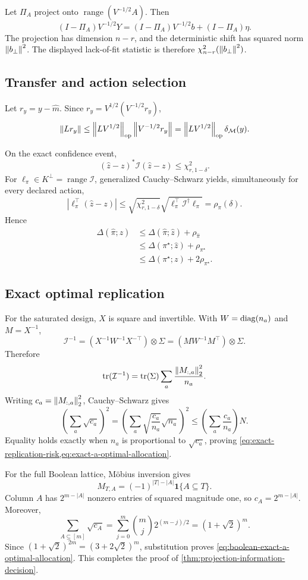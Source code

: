 Let $\Pi_A$ project onto $\operatorname{range}(V^{-1/2}A)$.  Then
\[
(I-\Pi_A)V^{-1/2}Y
=(I-\Pi_A)V^{-1/2}b+(I-\Pi_A)\eta.
\]
The projection has dimension $n-r$, and the deterministic shift has squared
norm $\left\lVert b_\perp\right\rVert^2$.  The displayed lack-of-fit statistic is therefore
$\chi^2_{n-r}(\left\lVert b_\perp\right\rVert^2)$.

\subsection{Transfer and action selection}

Let $r_y=y-\widehat m$.  Since
$r_y=V^{1/2}(V^{-1/2}r_y)$,
\[
\left\lVert Lr_y\right\rVert
\le\left\lVert LV^{1/2}\right\rVert_{\mathrm{op}}\left\lVert V^{-1/2}r_y\right\rVert
=\left\lVert LV^{1/2}\right\rVert_{\mathrm{op}}\delta_{\mathcal M}(y).
\]

On the exact confidence event,
\[
(\widehat z-z)^\ast\mathcal I(\widehat z-z)
\le\chi^2_{r,1-\delta}.
\]
For $\ell_\pi\in K^\perp=\operatorname{range}\mathcal I$, generalized
Cauchy--Schwarz yields, simultaneously for every declared action,
\[
|\ell_\pi^\top(\widehat z-z)|
\le
\sqrt{\chi^2_{r,1-\delta}}
\sqrt{\ell_\pi^\top\mathcal I^\dagger\ell_\pi}
=\rho_\pi(\delta).
\]
Hence
\begin{align*}
\Delta(\widehat\pi;z)
&\le\Delta(\widehat\pi;\widehat z)+\rho_{\widehat\pi}\\
&\le\Delta(\pi^\star;\widehat z)+\rho_{\pi^\star}\\
&\le\Delta(\pi^\star;z)+2\rho_{\pi^\star}.
\end{align*}

\subsection{Exact optimal replication}

For the saturated design, $X$ is square and invertible.  With
$W=\operatorname{diag}(n_a)$ and $M=X^{-1}$,
\[
\mathcal I^{-1}
=(X^{-1}W^{-1}X^{-\top})\otimes\Sigma
=(MW^{-1}M^\top)\otimes\Sigma.
\]
Therefore
\[
\operatorname{tr}(\mathcal I^{-1})
=\operatorname{tr}(\Sigma)\sum_a\frac{\left\lVert M_{:,a}\right\rVert_2^2}{n_a}.
\]
Writing $c_a=\left\lVert M_{:,a}\right\rVert_2^2$, Cauchy--Schwarz gives
\[
\left(\sum_a\sqrt{c_a}\right)^2
=\left(\sum_a\sqrt{\frac{c_a}{n_a}}\sqrt{n_a}\right)^2
\le\left(\sum_a\frac{c_a}{n_a}\right)N.
\]
Equality holds exactly when $n_a$ is proportional to $\sqrt{c_a}$, proving
\cref{eq:exact-replication-risk,eq:exact-a-optimal-allocation}.

For the full Boolean lattice, M\"obius inversion gives
\[
M_{T,A}=(-1)^{|T|-|A|}\mathbf1\{A\subseteq T\}.
\]
Column $A$ has $2^{m-|A|}$ nonzero entries of squared magnitude one, so
$c_A=2^{m-|A|}$.  Moreover,
\[
\sum_{A\subseteq[m]}\sqrt{c_A}
=\sum_{j=0}^m\binom mj2^{(m-j)/2}
=(1+\sqrt2)^m.
\]
Since $(1+\sqrt2)^{2m}=(3+2\sqrt2)^m$, substitution proves
\cref{eq:boolean-exact-a-optimal-allocation}.  This completes the proof of
\cref{thm:projection-information-decision}.

